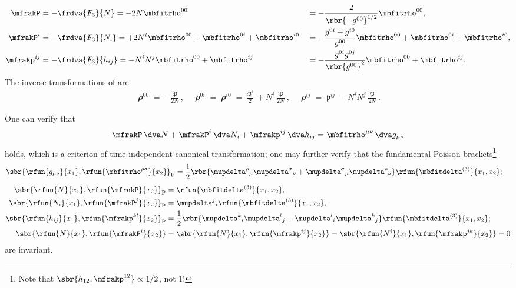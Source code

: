 \documentclass[a4paper,11pt]{article}
\begin{document}
\begin{alignat}{3}
\mfrakP
&= -\frdva{F_3}{N} = -2 N \mbfitrho^{00}
&&= -\frac{2}{\rbr{-g^{00}}^{1/2}}\mbfitrho^{00},
\label{eq:Pinrho00}\\
\mfrakP^i
&= -\frdva{F_3}{N_i} = +2 N^i \mbfitrho^{00} + \mbfitrho^{0i} + \mbfitrho^{i0}
&&= -\frac{g^{0i}+g^{i0}}{g^{00}} \mbfitrho^{00}
+ \mbfitrho^{0i} + \mbfitrho^{i0},
\label{eq:Piinrho0i}\\
\mfrakp^{ij}
&= -\frdva{F_3}{h_{ij}} = -N^i N^j \mbfitrho^{00} + \mbfitrho^{ij}
&&= -\frac{g^{0i}g^{0j}}{\rbr{g^{00}}^2}\mbfitrho^{00} + \mbfitrho^{ij}.
\label{eq:pijinrhoij}
\end{alignat}
The inverse transformations of  are
\begin{align}
\mbfitrho^{00} = -\frac{\mfrakP}{2N}, \quad
\mbfitrho^{0i} = \mbfitrho^{i0} =
\frac{\mfrakP^i}{2} + N^i \frac{\mfrakP}{2N}, \quad
\mbfitrho^{ij} = \mfrakp^{ij}-N^i N^j\frac{\mfrakP}{2N}.
\end{align}

One can verify that
\begin{align}
\mfrakP\,\dva N + \mfrakP^i\,\dva N_i + \mfrakp^{ij}\,\dva h_{ij} = 
\mbfitrho^{\mu\nu}\,\dva g_{\mu\nu}
\end{align}
holds, which is a criterion of time-independent canonical transformation; 
one may further verify that the fundamental Poisson brackets\footnote{Note that 
$\sbr{h_{12}, \mfrakp^{12}} \propto 1/2$, not $1$!}
\begin{align}
\sbr{\rfun{g_{\mu\nu}}{x_1}, \rfun{\mbfitrho^{\rho\sigma}}{x_2}}_\text{P} &= 
\frac{1}{2} \rbr{
\mupdelta^\rho{}_\mu \mupdelta^\sigma{}_\nu +
\mupdelta^\sigma{}_\mu \mupdelta^\rho{}_\nu}
\rfun{\mbfitdelta^{(3)}}{x_1, x_2};
\end{align}
\begin{align}
\begin{aligned}
\sbr{\rfun{N}{x_1}, \rfun{\mfrakP}{x_2}}_\text{P} &= 
\rfun{\mbfitdelta^{(3)}}{x_1, x_2},
\\
\sbr{\rfun{N_i}{x_1}, \rfun{\mfrakP^j}{x_2}}_\text{P} &=
\mupdelta^j{}_i
\rfun{\mbfitdelta^{(3)}}{x_1, x_2},
\\
\sbr{\rfun{h_{ij}}{x_1}, \rfun{\mfrakp^{kl}}{x_2}}_\text{P} &= 
\frac{1}{2} \rbr{
\mupdelta^k{}_i \mupdelta^l{}_j + \mupdelta^l{}_i \mupdelta^k{}_j}
\rfun{\mbfitdelta^{(3)}}{x_1, x_2};
\\
\sbr{\rfun{N}{x_1}, \rfun{\mfrakP^i}{x_2}} &=
\sbr{\rfun{N}{x_1}, \rfun{\mfrakp^{ij}}{x_2}} =
\sbr{\rfun{N^i}{x_1}, \rfun{\mfrakp^{jk}}{x_2}} = 0
\end{aligned}
\end{align}
are invariant.
\end{document}

